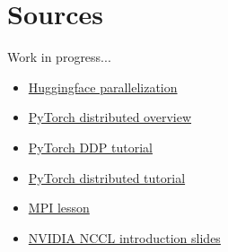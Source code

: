 \section{Sources}
Work in progress...
\begin{itemize}
    \item \href{https://huggingface.co/docs/transformers/main/en/perf_train_gpu_many#data-parallelism}{Huggingface parallelization}
    \item \href{https://pytorch.org/tutorials/beginner/dist_overview.html}{PyTorch distributed overview}
    \item \href{https://pytorch.org/tutorials/intermediate/ddp_tutorial.html}{PyTorch DDP tutorial}
    \item \href{https://pytorch.org/tutorials/intermediate/dist_tuto.html}{PyTorch distributed tutorial}
    \item \href{https://indico.desy.de/event/12535/contributions/9450/attachments/6466/7452/CL5_MPI_Lecture.pdf}{MPI lesson}
    \item \href{https://images.nvidia.com/events/sc15/pdfs/NCCL-Woolley.pdf}{NVIDIA NCCL introduction slides}
\end{itemize}